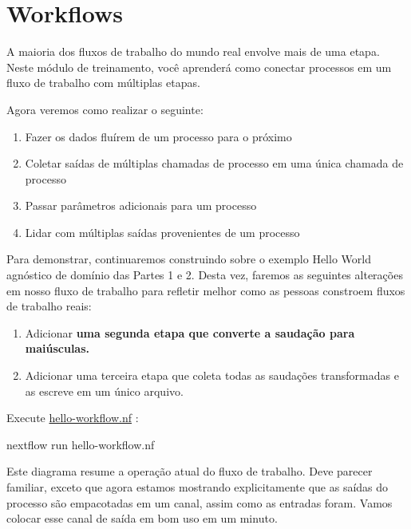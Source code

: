 \documentclass[
  brazilian,
  letterpaper,
  DIV=11,
  numbers=noendperiod]{scrreprt}
\newenvironment{Shaded}{\begin{snugshade}}{\end{snugshade}}
\newcommand{\ExtensionTok}[1]{\textcolor[rgb]{0.00,0.23,0.31}{#1}}
\newcommand{\NormalTok}[1]{\textcolor[rgb]{0.00,0.23,0.31}{#1}}
\providecommand{\tightlist}{%
  \setlength{\itemsep}{0pt}\setlength{\parskip}{0pt}}
\begin{document}
\section{Workflows}\label{workflows}

A maioria dos fluxos de trabalho do mundo real envolve mais de uma
etapa. Neste módulo de treinamento, você aprenderá como conectar
processos em um fluxo de trabalho com múltiplas etapas.

Agora veremos como realizar o seguinte:

\begin{enumerate}
\def\labelenumi{\arabic{enumi}.}
\tightlist
\item
  Fazer os dados fluírem de um processo para o próximo
\item
  Coletar saídas de múltiplas chamadas de processo em uma única chamada
  de processo
\item
  Passar parâmetros adicionais para um processo
\item
  Lidar com múltiplas saídas provenientes de um processo
\end{enumerate}

Para demonstrar, continuaremos construindo sobre o exemplo Hello World
agnóstico de domínio das Partes 1 e 2. Desta vez, faremos as seguintes
alterações em nosso fluxo de trabalho para refletir melhor como as
pessoas constroem fluxos de trabalho reais:

\begin{enumerate}
\def\labelenumi{\arabic{enumi}.}
\tightlist
\item
  Adicionar \textbf{uma segunda etapa que converte a saudação para
  maiúsculas.}
\item
  Adicionar uma terceira etapa que coleta todas as saudações
  transformadas e as escreve em um único arquivo.
\end{enumerate}

Execute \href{../hello_nextflow/hello-workflow.nf}{hello-workflow.nf} :

\begin{Shaded}
\begin{Highlighting}[]
\ExtensionTok{nextflow}\NormalTok{ run hello{-}workflow.nf}
\end{Highlighting}
\end{Shaded}

Este diagrama resume a operação atual do fluxo de trabalho. Deve parecer
familiar, exceto que agora estamos mostrando explicitamente que as
saídas do processo são empacotadas em um canal, assim como as entradas
foram. Vamos colocar esse canal de saída em bom uso em um minuto.
\end{document}
